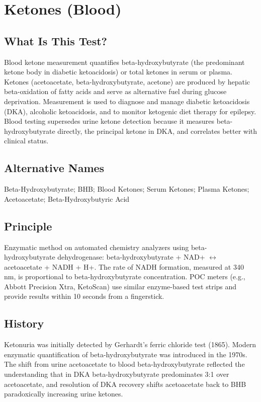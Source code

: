 \chapter{Ketones (Blood)}

\section*{What Is This Test?}
Blood ketone measurement quantifies beta-hydroxybutyrate (the predominant ketone body in diabetic ketoacidosis) or total ketones in serum or plasma. Ketones (acetoacetate, beta-hydroxybutyrate, acetone) are produced by hepatic beta-oxidation of fatty acids and serve as alternative fuel during glucose deprivation. Measurement is used to diagnose and manage diabetic ketoacidosis (DKA), alcoholic ketoacidosis, and to monitor ketogenic diet therapy for epilepsy. Blood testing supersedes urine ketone detection because it measures beta-hydroxybutyrate directly, the principal ketone in DKA, and correlates better with clinical status.

\section*{Alternative Names}
Beta-Hydroxybutyrate; BHB; Blood Ketones; Serum Ketones; Plasma Ketones; Acetoacetate; Beta-Hydroxybutyric Acid

\section*{Principle}
Enzymatic method on automated chemistry analyzers using beta-hydroxybutyrate dehydrogenase: beta-hydroxybutyrate + NAD+ $\leftrightarrow$ acetoacetate + NADH + H+. The rate of NADH formation, measured at 340 nm, is proportional to beta-hydroxybutyrate concentration. POC meters (e.g., Abbott Precision Xtra, KetoScan) use similar enzyme-based test strips and provide results within 10 seconds from a fingerstick.

\section*{History}
Ketonuria was initially detected by Gerhardt's ferric chloride test (1865). Modern enzymatic quantification of beta-hydroxybutyrate was introduced in the 1970s. The shift from urine acetoacetate to blood beta-hydroxybutyrate reflected the understanding that in DKA beta-hydroxybutyrate predominates 3:1 over acetoacetate, and resolution of DKA recovery shifts acetoacetate back to BHB paradoxically increasing urine ketones.

